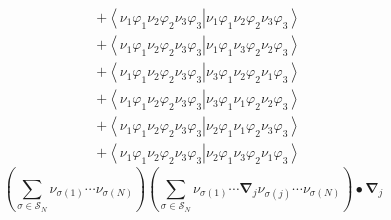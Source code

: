 \documentclass[aps,preprint]{revtex4}%
\begin{document}
\begin{align}
& +\left\langle \nu_{1}\varphi_{1}\nu_{2}\varphi_{2}\nu_{3}\varphi
_{3}\right\vert \left.  \nu_{1}\varphi_{1}\nu_{2}\varphi_{2}\nu_{3}\varphi
_{3}\right\rangle \\
& +\left\langle \nu_{1}\varphi_{1}\nu_{2}\varphi_{2}\nu_{3}\varphi
_{3}\right\vert \left.  \nu_{1}\varphi_{1}\nu_{3}\varphi_{2}\nu_{2}\varphi
_{3}\right\rangle \\
& +\left\langle \nu_{1}\varphi_{1}\nu_{2}\varphi_{2}\nu_{3}\varphi
_{3}\right\vert \left.  \nu_{3}\varphi_{1}\nu_{2}\varphi_{2}\nu_{1}\varphi
_{3}\right\rangle \\
& +\left\langle \nu_{1}\varphi_{1}\nu_{2}\varphi_{2}\nu_{3}\varphi
_{3}\right\vert \left.  \nu_{3}\varphi_{1}\nu_{1}\varphi_{2}\nu_{2}\varphi
_{3}\right\rangle \\
& +\left\langle \nu_{1}\varphi_{1}\nu_{2}\varphi_{2}\nu_{3}\varphi
_{3}\right\vert \left.  \nu_{2}\varphi_{1}\nu_{1}\varphi_{2}\nu_{3}\varphi
_{3}\right\rangle \\
& +\left\langle \nu_{1}\varphi_{1}\nu_{2}\varphi_{2}\nu_{3}\varphi
_{3}\right\vert \left.  \nu_{2}\varphi_{1}\nu_{3}\varphi_{2}\nu_{1}\varphi
_{3}\right\rangle
\end{align}%
\begin{equation}
\left(
{\textstyle\sum\limits_{\sigma\in\mathcal{S}_{N}}}
\nu_{\sigma\left(  1\right)  }\cdots\nu_{\sigma\left(  N\right)  }\right)
\left(
{\textstyle\sum\limits_{\sigma\in\mathcal{S}_{N}}}
\nu_{\sigma\left(  1\right)  }\cdots\mathbf{\nabla}_{j}\nu_{\sigma\left(
j\right)  }\cdots\nu_{\sigma\left(  N\right)  }\right)  \bullet\mathbf{\nabla
}_{j}%
\end{equation}
%
\end{document}
